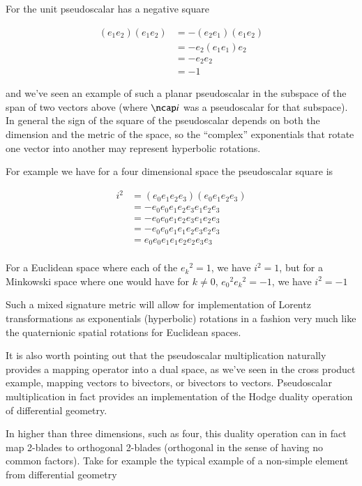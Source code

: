 For  the unit pseudoscalar has a negative square

\begin{align*}
(e_1 e_2) (e_1 e_2)
&=
- (e_2 e_1) (e_1 e_2) \\
&=
- e_2 (e_1 e_1) e_2 \\
&=
- e_2 e_2 \\
&=
-1
\end{align*}

and we've seen an example of such a planar pseudoscalar in the subspace of the span of two vectors above (where $\ncap i$ was a pseudoscalar
for that subspace).  In general the sign of the square of the pseudoscalar depends on both the dimension and the metric of the space, 
so the ``complex'' exponentials that rotate one vector into another may represent hyperbolic rotations.

For example we have for a four dimensional space the pseudoscalar square is

\begin{align*}
i^2 &=
(e_0 e_1 e_2 e_3) (e_0 e_1 e_2 e_3) \\
&=
- e_0 e_0 e_1 e_2 e_3 e_1 e_2 e_3 \\
&=
- e_0 e_0 e_1 e_2 e_3 e_1 e_2 e_3 \\
&=
- e_0 e_0 e_1 e_1 e_2 e_3 e_2 e_3 \\
&=
e_0 e_0 e_1 e_1 e_2 e_2 e_3 e_3 \\
\end{align*}

For a Euclidean space where each of the ${e_k}^2 = 1$, we have $i^2 = 1$, but for a Minkowski space where one would have for $k\ne0$, ${e_0}^2 {e_k}^2 = -1$, we have $i^2 = -1$

Such a mixed signature metric will allow for implementation of Lorentz transformations as exponentials (hyperbolic) rotations
in a fashion very much like the quaternionic spatial rotations for Euclidean spaces.

It is also worth pointing out that the pseudoscalar multiplication naturally provides a mapping operator into a dual space, as we've seen 
in the cross product example, mapping vectors to bivectors, or bivectors to vectors.  Pseudoscalar multiplication in fact provides an 
implementation of the Hodge duality operation of differential geometry.

In higher than three dimensions, such as four, this duality operation can in fact map 2-blades to orthogonal 2-blades (orthogonal in the sense
of having no common factors).  Take for example the typical example of a non-simple element from differential geometry

